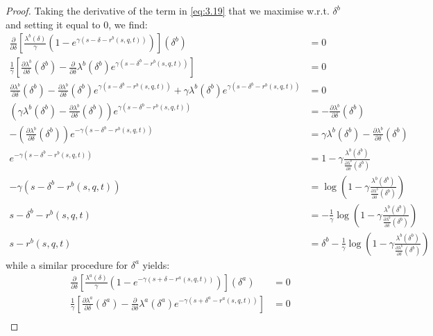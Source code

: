 \begin{proof}
    Taking the derivative of the term in \ref{eq:3.19} that we maximise w.r.t. $\delta^b$
    and setting it equal to 0, we find:
    \begin{align*}
        \frac{\partial}{\partial\delta}\left[\frac{\lambda^b(\delta)}{\gamma}(1-e^{\gamma(s-\delta-r^b(s,q,t))})\right](\delta^b)&=0\\
        \frac{1}{\gamma}\left[\frac{\partial\lambda^b}{\partial\delta}(\delta^b)-\frac{\partial}{\partial\delta}\lambda^b(\delta^b)e^{\gamma(s-\delta^b-r^b(s,q,t))}\right]&=0\\
        \frac{\partial\lambda^b}{\partial\delta}(\delta^b)-\frac{\partial\lambda^b}{\partial\delta}(\delta^b)e^{\gamma(s-\delta^b-r^b(s,q,t))}+\gamma\lambda^b(\delta^b)e^{\gamma(s-\delta^b-r^b(s,q,t))}&=0\\
        \left(\gamma\lambda^b(\delta^b)-\frac{\partial\lambda^b}{\partial\delta}(\delta^b)\right)e^{\gamma(s-\delta^b-r^b(s,q,t))}&=-\frac{\partial\lambda^b}{\partial\delta}(\delta^b)\\
        -\left(\frac{\partial\lambda^b}{\partial\delta}(\delta^b)\right)e^{-\gamma(s-\delta^b-r^b(s,q,t))}&=\gamma\lambda^b(\delta^b)-\frac{\partial\lambda^b}{\partial\delta}(\delta^b)\\
        e^{-\gamma(s-\delta^b-r^b(s,q,t))}&=1-\gamma\frac{\lambda^b(\delta^b)}{\frac{\partial\lambda^b}{\partial\delta}(\delta^b)}\\
        -\gamma(s-\delta^b-r^b(s,q,t))&=\log\left(1-\gamma\frac{\lambda^b(\delta^b)}{\frac{\partial\lambda^b}{\partial\delta}(\delta^b)}\right)\\
        s-\delta^b-r^b(s,q,t)&=-\frac{1}{\gamma}\log\left(1-\gamma\frac{\lambda^b(\delta^b)}{\frac{\partial\lambda^b}{\partial\delta}(\delta^b)}\right)\\
        s-r^b(s,q,t)&=\delta^b-\frac{1}{\gamma}\log\left(1-\gamma\frac{\lambda^b(\delta^b)}{\frac{\partial\lambda^b}{\partial\delta}(\delta^b)}\right)
    \end{align*}
    while a similar procedure for $\delta^a$ yields:
    \begin{align*}
        \frac{\partial}{\partial\delta}\left[\frac{\lambda^a(\delta)}{\gamma}(1-e^{-\gamma(s+\delta-r^a(s,q,t))})\right](\delta^a)&=0\\
        \frac{1}{\gamma}\left[\frac{\partial\lambda^a}{\partial\delta}(\delta^a)-\frac{\partial}{\partial\delta}\lambda^a(\delta^a)e^{-\gamma(s+\delta^a-r^a(s,q,t))}\right]&=0\\

\end{align*}
\end{proof}

